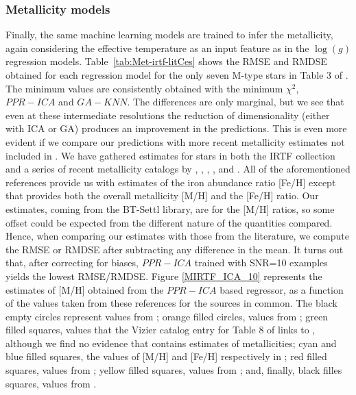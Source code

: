 \subsubsection{Metallicity models} 
\label{sect:irtf-met}
Finally, the same machine learning models are trained to infer the
metallicity, again considering the effective temperature as an input
feature as in the $\log(g)$ regression
models. Table~\ref{tab:Met-irtf-litCes} shows the RMSE and RMDSE
obtained for each regression model for the only seven M-type stars in
Table 3 of \cite{cesetti}. The minimum values are consistently obtained 
with the minimum $\chi^2$, $PPR-ICA$ and $GA-KNN$. The differences are 
only marginal, but we see that even at these intermediate resolutions 
the reduction of dimensionality (either with ICA or GA) produces an 
improvement in the predictions. This is even more evident if we 
compare our predictions with more recent metallicity estimates not 
included in \cite{cesetti}. We have gathered estimates for stars in 
both the IRTF collection and a series of recent metallicity catalogs 
by \cite{RA2012}, \cite{NevesIII}, \cite{Newton2014}, \cite{Gaidos2015}, 
and \cite{Mann2015}. All of the aforementioned references provide us 
with estimates of the iron abundance ratio [Fe/H] except \cite{RA2012} that 
provides both the overall metallicity [M/H]
and the [Fe/H] ratio. Our estimates, coming from the BT-Settl library, are 
for the [M/H] ratios, so some offset could be expected from the 
different nature of the quantities compared. Hence, when comparing our 
estimates with those from the literature, we compute the RMSE or RMDSE 
after subtracting any difference in the mean. It turns out that, after 
correcting for biases, $PPR-ICA$ trained with SNR=10 examples 
yields the lowest RMSE/RMDSE. Figure \ref{MIRTF_ICA_10} 
represents the estimates of [M/H] obtained from the $PPR-ICA$ based 
regressor, as a function of the values taken from these references for 
the sources in common. The black empty circles represent values from \cite{cesetti}
; orange filled circles, values from \cite{NevesIII};  green filled 
squares, values that the Vizier catalog entry for Table 8 of 
\cite{NevesIII} links to \cite{Jao}, although we find no evidence that \cite{Jao} 
contains estimates of metallicities; cyan and blue filled squares, the values 
of [M/H] and [Fe/H] respectively in \cite{RA2012}; red filled squares, values 
from \cite{Mann2015}; yellow filled squares,  values from \cite{Newton2014}; and, 
finally, black filles squares, values from \cite{Gaidos2015}.

